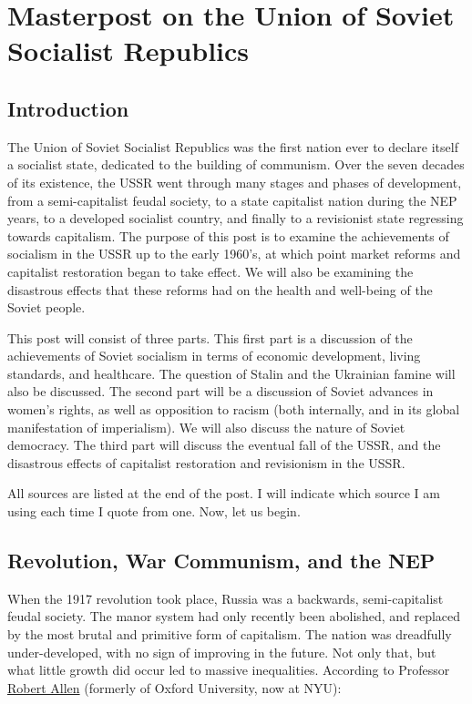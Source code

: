 \section{Masterpost on the Union of Soviet Socialist Republics}

\subsection*{Introduction}

The Union of Soviet Socialist Republics was the first nation ever to
declare itself a socialist state, dedicated to the building of
communism. Over the seven decades of its existence, the USSR went
through many stages and phases of development, from a semi-capitalist
feudal society, to a state capitalist nation during the NEP years, to a
developed socialist country, and finally to a revisionist state
regressing towards capitalism. The purpose of this post is to examine
the achievements of socialism in the USSR up to the early 1960's, at
which point market reforms and capitalist restoration began to take
effect. We will also be examining the disastrous effects that these
reforms had on the health and well-being of the Soviet people.

This post will consist of three parts. This first part is a discussion
of the achievements of Soviet socialism in terms of economic
development, living standards, and healthcare. The question of Stalin
and the Ukrainian famine will also be discussed. The second part will be
a discussion of Soviet advances in women's rights, as well as opposition
to racism (both internally, and in its global manifestation of
imperialism). We will also discuss the nature of Soviet democracy. The
third part will discuss the eventual fall of the USSR, and the
disastrous effects of capitalist restoration and revisionism in the
USSR.

All sources are listed at the end of the post. I will indicate which
source I am using each time I quote from one. Now, let us begin.

\subsection*{Revolution, War Communism, and the NEP}

When the 1917 revolution took place, Russia was a backwards,
semi-capitalist feudal society. The manor system had only recently been
abolished, and replaced by the most brutal and primitive form of
capitalism. The nation was dreadfully under-developed, with no sign of
improving in the future. Not only that, but what little growth did occur
led to massive inequalities. According to Professor
\href{https://nyuad.nyu.edu/en/academics/divisions/social-science/faculty/robert-allen.html}{Robert
Allen} (formerly of Oxford University, now at NYU):

